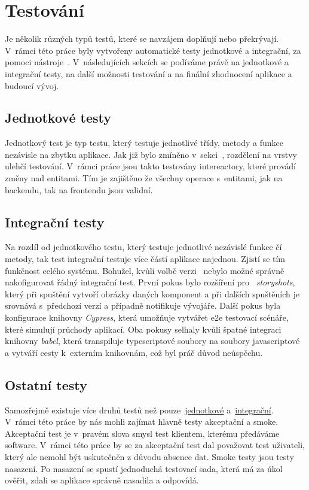 \chapter{Testování}
\label{ch:testing}
Je několik různých typů testů, které se navzájem doplňují nebo překrývají. V~rámci této práce byly vytvořeny automatické testy jednotkové a integrační, za pomoci nástroje~. V~následujících sekcích se podíváme právě na jednotkové a integrační testy, na další možnosti testování a na finální zhodnocení aplikace a budoucí vývoj.

\section{Jednotkové testy}
\label{sc:unit_tests}
Jednotkový test je typ testu, který testuje jednotlivé třídy, metody a funkce nezávisle na zbytku aplikace. Jak již bylo zmíněno v~sekci~, rozdělení na vrstvy ulehčí testování. V~rámci práce jsou takto testovány intereactory, které provádí změny nad entitami. Tím je zajištěno že všechny operace s~entitami, jak na backendu, tak na frontendu jsou validní.

\section{Integrační testy}
\label{sc:unit_tests}
Na rozdíl od jednotkového testu, který testuje jednotlivé nezávislé funkce čí metody, tak test integrační testuje více částí aplikace najednou. Zjistí se tím funkčnost celého systému. Bohužel, kvůli volbě verzi~ nebylo možné správně nakofigurovat řádný integrační test. První pokus bylo rozšíření pro~ \emph{storyshots}, který při spuštění vytvoří obrázky daných komponent a při dalších spuštěních je srovnává s~předchozí verzí a případně notifikuje vývojáře. Další pokus byla konfigurace knihovny \emph{Cypress}, která umožňuje vytvářet \acrfull{e2e} testovací scénáře, které simulují průchody aplikací. Oba pokusy selhaly kvůli špatné integraci knihovny \emph{babel}, která transpiluje typescriptové soubory na soubory javascriptové a vytváří cesty k~externím knihovnám, což byl práě důvod neúspěchu.

\section{Ostatní testy}
Samozřejmě existuje více druhů testů než pouze~\hyperref[sc:unit_tests]{jednotkové} a~\hyperref[sc:unit_tests]{integrační}. V~rámci této práce by nás mohli zajímat hlavně testy akceptační a smoke. Akceptační test je v~pravém slova smysl test klientem, kterému předáváme software. V~rámci této práce by se za akceptační test dal považovat test uživateli, který ale nemohl být uskutečněn z důvodu absence dat. Smoke testy jsou testy nasazení. Po nasazení se spustí jednoduchá testovací sada, která má za úkol ověřit, zdali se aplikace správně nasadila a odpovídá.

